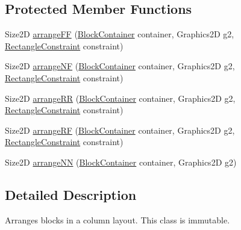 \subsection*{Protected Member Functions}
\begin{DoxyCompactItemize}
\item 
Size2D \mbox{\hyperlink{classorg_1_1jfree_1_1chart_1_1block_1_1_column_arrangement_a6fb3760f183aad27937000b9d23970f8}{arrange\+FF}} (\mbox{\hyperlink{classorg_1_1jfree_1_1chart_1_1block_1_1_block_container}{Block\+Container}} container, Graphics2D g2, \mbox{\hyperlink{classorg_1_1jfree_1_1chart_1_1block_1_1_rectangle_constraint}{Rectangle\+Constraint}} constraint)
\item 
Size2D \mbox{\hyperlink{classorg_1_1jfree_1_1chart_1_1block_1_1_column_arrangement_a5608e9c89d9bcf1241f3172d6b3a9720}{arrange\+NF}} (\mbox{\hyperlink{classorg_1_1jfree_1_1chart_1_1block_1_1_block_container}{Block\+Container}} container, Graphics2D g2, \mbox{\hyperlink{classorg_1_1jfree_1_1chart_1_1block_1_1_rectangle_constraint}{Rectangle\+Constraint}} constraint)
\item 
Size2D \mbox{\hyperlink{classorg_1_1jfree_1_1chart_1_1block_1_1_column_arrangement_ac73dd1076a7e7c54d40c9c6ffbdf9f36}{arrange\+RR}} (\mbox{\hyperlink{classorg_1_1jfree_1_1chart_1_1block_1_1_block_container}{Block\+Container}} container, Graphics2D g2, \mbox{\hyperlink{classorg_1_1jfree_1_1chart_1_1block_1_1_rectangle_constraint}{Rectangle\+Constraint}} constraint)
\item 
Size2D \mbox{\hyperlink{classorg_1_1jfree_1_1chart_1_1block_1_1_column_arrangement_aee5eb34f12f4a734be7af2c8110e4bf2}{arrange\+RF}} (\mbox{\hyperlink{classorg_1_1jfree_1_1chart_1_1block_1_1_block_container}{Block\+Container}} container, Graphics2D g2, \mbox{\hyperlink{classorg_1_1jfree_1_1chart_1_1block_1_1_rectangle_constraint}{Rectangle\+Constraint}} constraint)
\item 
Size2D \mbox{\hyperlink{classorg_1_1jfree_1_1chart_1_1block_1_1_column_arrangement_ac21fdf947e422c5c3ec7b4c3c16d6f7c}{arrange\+NN}} (\mbox{\hyperlink{classorg_1_1jfree_1_1chart_1_1block_1_1_block_container}{Block\+Container}} container, Graphics2D g2)
\end{DoxyCompactItemize}


\subsection{Detailed Description}
Arranges blocks in a column layout. This class is immutable. 

